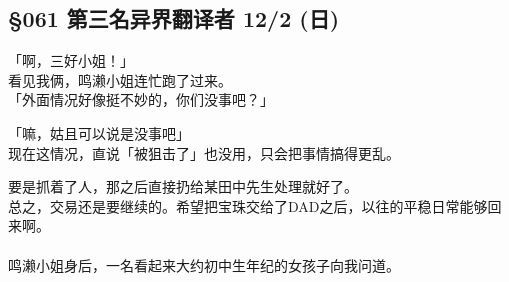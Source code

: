 \subsection{§061 第三名异界翻译者 12/2 (日)}

「啊，三好小姐！」\\

看见我俩，鸣濑小姐连忙跑了过来。\\

「外面情况好像挺不妙的，你们没事吧？」

「嘛，姑且可以说是没事吧」\\

现在这情况，直说「被狙击了」也没用，只会把事情搞得更乱。

要是抓着了人，那之后直接扔给某田中先生处理就好了。\\

总之，交易还是要继续的。希望把宝珠交给了DAD之后，以往的平稳日常能够回来啊。\\

\\

鸣濑小姐身后，一名看起来大约初中生年纪的女孩子向我问道。\\

\\

